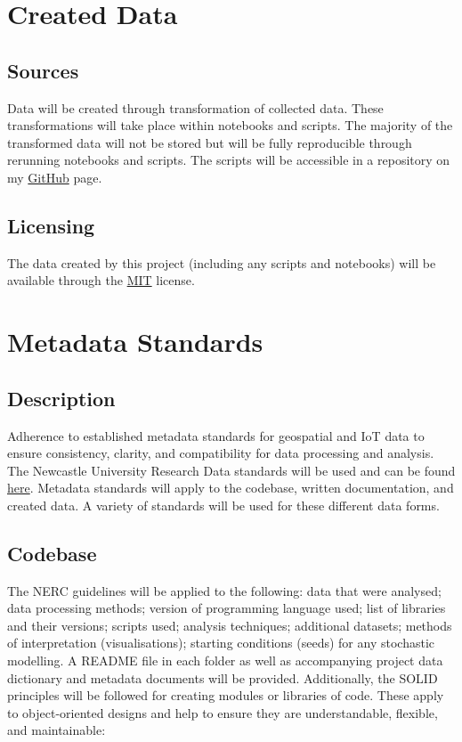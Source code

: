 \documentclass[a4paper, 11pt]{article}
\begin{document}
\section{Created Data}

\subsection{Sources}

Data will be created through transformation of collected data. These transformations will take place within notebooks and scripts. The majority of the transformed data will not be stored but will be fully reproducible through rerunning notebooks and scripts. The scripts will be accessible in a repository on my \href{https://github.com/carrowmw}{GitHub} page.

\subsection{Licensing}

The data created by this project (including any scripts and notebooks) will be available through the \href{https://opensource.org/license/mit}{MIT} license.

\section{Metadata Standards}

\subsection{Description}

Adherence to established metadata standards for geospatial and IoT data to ensure consistency, clarity, and compatibility for data processing and analysis. The Newcastle University Research Data standards will be used and can be found \href{https://www.ncl.ac.uk/library/academics-and-researchers/research/rdm/working/organise/?}{here}. Metadata standards will apply to the codebase, written documentation, and created data. A variety of standards will be used for these different data forms.

\subsection{Codebase}

The NERC guidelines will be applied to the following: data that were analysed; data processing methods; version of programming language used; list of libraries and their versions; scripts used; analysis techniques; additional datasets; methods of interpretation (visualisations); starting conditions (seeds) for any stochastic modelling. A README file in each folder as well as accompanying project data dictionary and metadata documents will be provided.
Additionally, the SOLID principles will be followed for creating modules or libraries of code. These apply to object-oriented designs and help to ensure they are understandable, flexible, and maintainable:
\end{document}
